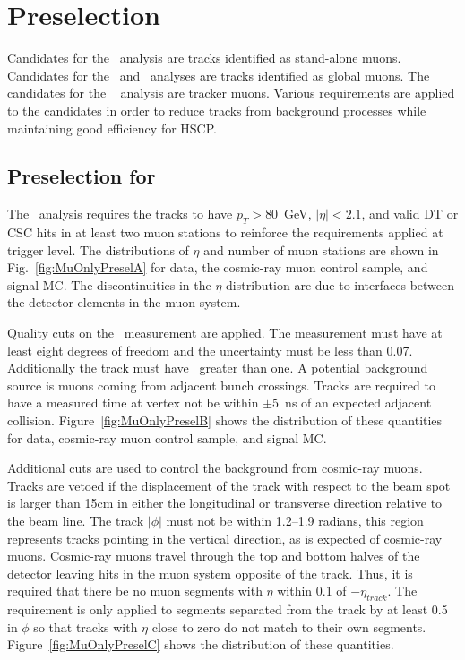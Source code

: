 \section{Preselection \label{sec:preselection}}
Candidates for the \muononly\ analysis are tracks identified as stand-alone muons. Candidates for the \tktof\ and \multi\ analyses are tracks identified
as global muons. The candidates for the \tkonly\
analysis are tracker muons.
Various requirements are applied to the candidates in order to reduce tracks from background processes while maintaining good efficiency for HSCP.

\subsection{Preselection for \muononly\ \label{sec:muonlypreselection}}

The \muononly\ analysis requires the tracks to have $p_T > 80$~GeV, $|\eta| < 2.1$, and valid DT or CSC hits in at least two muon stations
to reinforce the requirements applied at trigger level. 
The distributions of $\eta$ and number of muon stations are shown in Fig.~\ref{fig:MuOnlyPreselA} for data, the cosmic-ray muon control sample, and signal MC.
The discontinuities in the $\eta$ distribution are due to interfaces between the detector elements in the muon system.

Quality cuts on the \invbeta\ measurement are applied. The measurement must have at least eight degrees of freedom and the uncertainty must be less than 0.07.
Additionally the track must have \invbeta\ greater than one.
A potential background source is muons coming from adjacent bunch crossings.
Tracks are required to have a measured time at vertex not be within $\pm5$~ns of an expected adjacent collision.
Figure~\ref{fig:MuOnlyPreselB} shows the distribution of these quantities for data, cosmic-ray muon control sample, and signal MC.

Additional cuts are used to control the background from cosmic-ray muons. Tracks are vetoed if the displacement of the track
with respect to the beam spot is larger than 15cm in either the longitudinal or transverse direction relative to the beam line. 
The track $|\phi|$ must not be within 1.2--1.9 radians, this region represents tracks pointing in the vertical
direction, as is expected of cosmic-ray muons. Cosmic-ray muons travel 
through the top and bottom halves of the detector leaving hits in the muon system opposite of the track.
Thus, it is required that  there be no muon segments with $\eta$ within 0.1 of $-\eta_{track}$. The requirement is only applied to 
segments separated from the track by at least 0.5 in $\phi$ so that tracks with $\eta$ close to zero do not match to their own segments.
Figure~\ref{fig:MuOnlyPreselC} shows the distribution of these quantities.

